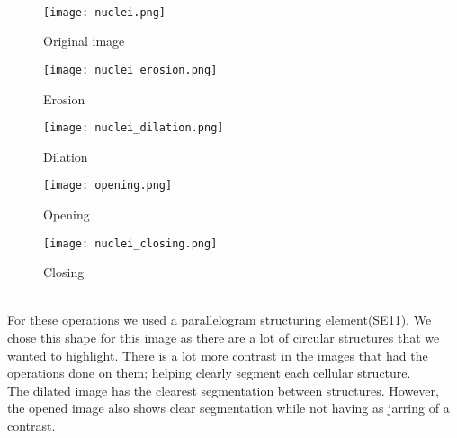 \documentclass[a4paper]{article}
\begin{document}
\newpage
\large{} \\ 
\begin{figure}[htp]
    \centering
    \texttt{[image: nuclei.png]}
    \caption{Original image}
    \label{fig:erosionSym}
\end{figure}
\begin{figure}[ht] 
  \label{ fig7} 
  \begin{minipage}[b]{0.5\linewidth}
    \centering
    \texttt{[image: nuclei\_erosion.png]} 
    \caption{Erosion} 
    \vspace{4ex}
  \end{minipage}%
  \begin{minipage}[b]{0.5\linewidth}
    \centering
    \texttt{[image: nuclei\_dilation.png]} 
    \caption{Dilation} 
    \vspace{4ex}
  \end{minipage} 
  \begin{minipage}[b]{0.5\linewidth}
    \centering
    \texttt{[image: opening.png]} 
    \caption{Opening} 
    \vspace{4ex}
  \end{minipage}%
  \begin{minipage}[b]{0.5\linewidth}
    \centering
    \texttt{[image: nuclei\_closing.png]} 
    \caption{Closing} 
    \vspace{4ex}
  \end{minipage} 
\end{figure} \\
For these operations we used a parallelogram structuring element(SE11). We chose this shape for this image as there are a lot of circular structures that we wanted to highlight. There is a lot more contrast in the images that had the operations done on them; helping clearly segment each cellular structure.\\

The dilated image has the clearest segmentation between structures. However, the opened image also shows clear segmentation while not having as jarring of a contrast. \\
\end{document}
